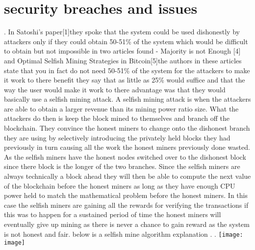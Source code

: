 \documentclass[report]{IEEEtran}
\begin{document}
\section{security breaches and issues}.\newline
In Satoshi's paper[1]they spoke that the system  could be used dishonestly by attackers only if they could obtain 50-51\% of the system which would be difficult to obtain but not impossible in two articles found -  Majority is not Enough [4] and Optimal Selfish Mining Strategies in Bitcoin[5]the authors in these articles state that you in fact do not need 50-51\% of the system for the attackers to make it work to there benefit they say that as little as 25\% would suffice and that the way the user would make it work to there advantage was that they would basically use a selfish mining attack. A selfish mining attack is when the attackers are able to obtain a larger revenue than its mining power ratio size. What the attackers do then is keep the block mined to themselves and branch off the blockchain. They convince the honest miners to change onto the dishonest branch they are using by selectively introducing the privately held blocks they had previously in turn causing all the work the honest miners previously done wasted. As the selfish miners have the honest nodes switched over to the dishonest block since there block is the longer of the two branches. Since the selfish miners are always technically a block ahead they will then be able to compute the next value of the blockchain before the honest miners as long as they have enough CPU power held to match the mathematical problem before the honest miners. In this case the selfish miners are gaining all the rewards for verifying the transactions if this was to happen for a sustained period of time the honest miners will eventually give up mining as there is never a chance to gain reward as the system is not honest and fair.
\newline below is a selfish mine algorithm explanation
\newline.
\newline.
\texttt{[image: image]}
\end{document}
